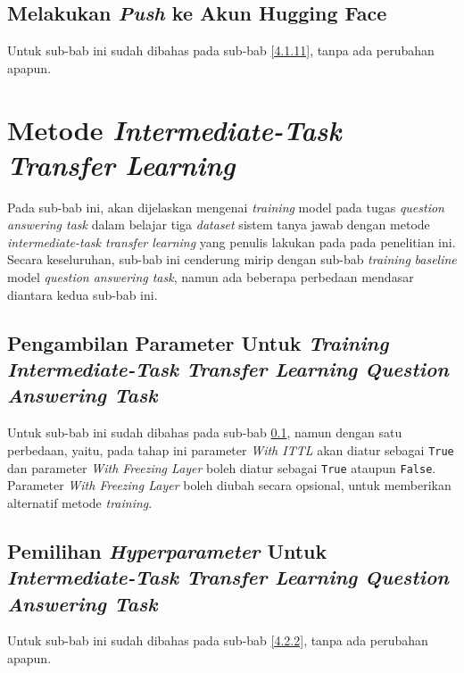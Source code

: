 \subsection{Melakukan \emph{Push} ke Akun Hugging Face}
\label{4.2.11}
Untuk sub-bab ini sudah dibahas pada sub-bab \ref{4.1.11}, tanpa ada perubahan apapun.

\section{Metode \emph{Intermediate-Task Transfer Learning}}
\label{4.3}
Pada sub-bab ini, akan dijelaskan mengenai \emph{training} model pada tugas \emph{question answering task} dalam belajar tiga \emph{dataset} sistem tanya jawab dengan metode \emph{intermediate-task transfer learning} yang penulis lakukan pada pada penelitian ini. Secara keseluruhan, sub-bab ini cenderung mirip dengan sub-bab \emph{training} \emph{baseline} model \emph{question answering task}, namun ada beberapa perbedaan mendasar diantara kedua sub-bab ini.

\subsection{Pengambilan Parameter Untuk \emph{Training Intermediate-Task Transfer Learning Question Answering Task}}
\label{4.3.1}
Untuk sub-bab ini sudah dibahas pada sub-bab \ref{4.2.11}, namun dengan satu perbedaan, yaitu, pada tahap ini parameter \emph{With ITTL} akan diatur sebagai \texttt{True} dan parameter \emph{With Freezing Layer} boleh diatur sebagai \texttt{True} ataupun \texttt{False}. Parameter \emph{With Freezing Layer} boleh diubah secara opsional, untuk memberikan alternatif metode \emph{training}.

\subsection{Pemilihan \emph{Hyperparameter} Untuk \emph{Intermediate-Task Transfer Learning Question Answering Task}}
\label{4.3.2}
Untuk sub-bab ini sudah dibahas pada sub-bab \ref{4.2.2}, tanpa ada perubahan apapun.

